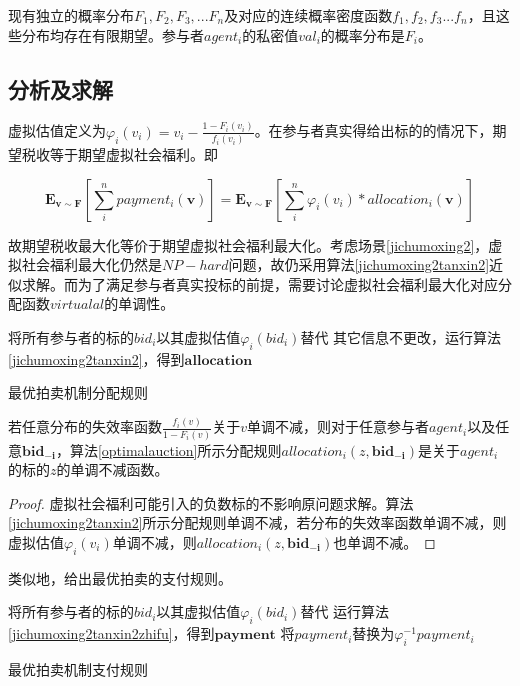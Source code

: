 \documentclass[promaster]{thesis-uestc}
\begin{document}
现有独立的概率分布$F_1,F_2,F_3,...F_n$及对应的连续概率密度函数$f_1,f_2,f_3...f_n$，且这些分布均存在有限期望。参与者$agent_i$的私密值$val_i$的概率分布是$F_i$。

\subsection{分析及求解}
虚拟估值定义为$\varphi _i(v_i)=v_i-\frac{1-F_i(v_i)}{f_i(v_i)}$。在参与者真实得给出标的的情况下，期望税收等于期望虚拟社会福利。即 

\begin{equation}
    \mathbf{E}_{\mathbf{v}\sim\mathbf{F}}{\left[\sum_{i}^{n}{payment_i(\mathbf{v})}\right]}=\mathbf{E}_{\mathbf{v}\sim\mathbf{F}}{\left[\sum_{i}^{n}{\varphi _i(v_i)*allocation_i(\mathbf{v})}\right]}
\end{equation}

故期望税收最大化等价于期望虚拟社会福利最大化。考虑场景\ref{jichumoxing2}，虚拟社会福利最大化仍然是$NP-hard$问题，故仍采用算法\ref{jichumoxing2tanxin2}近似求解。而为了满足参与者真实投标的前提，需要讨论虚拟社会福利最大化对应分配函数$virtualal$的单调性。

\begin{algorithm}[H] 
    将所有参与者的标的$bid_i$以其虚拟估值$\varphi _i(bid_i)$替代\;
    其它信息不更改，运行算法\ref{jichumoxing2tanxin2}，得到$\mathbf{allocation}$\;
\caption{最优拍卖机制分配规则}
\label{optimalauction}
\end{algorithm}



\begin{theorem}
若任意分布的失效率函数$\frac{f_i(v)}{1-F_i(v)}$关于$v$单调不减，则对于任意参与者$agent_i$以及任意$\mathbf{bid_{-i}}$，算法\ref{optimalauction}所示分配规则$allocation_i(z,\mathbf{bid_{-i}})$是关于$agent_i$的标的$z$的单调不减函数。
\end{theorem}

\begin{proof}
虚拟社会福利可能引入的负数标的不影响原问题求解。算法\ref{jichumoxing2tanxin2}所示分配规则单调不减，若分布的失效率函数单调不减，则虚拟估值$\varphi _i(v_i)$单调不减，则$allocation_i(z,\mathbf{bid_{-i}})$也单调不减。
\end{proof}

类似地，给出最优拍卖的支付规则。

\begin{algorithm}[H] 
    将所有参与者的标的$bid_i$以其虚拟估值$\varphi _i(bid_i)$替代\;
    运行算法\ref{jichumoxing2tanxin2zhifu}，得到$\mathbf{payment}$\;
    {
        将$payment_i$替换为$\varphi _{i}^{-1}{payment_i}$
    }
\caption{最优拍卖机制支付规则}
\label{optimalauctionzhifu}
\end{algorithm}
\end{document}
